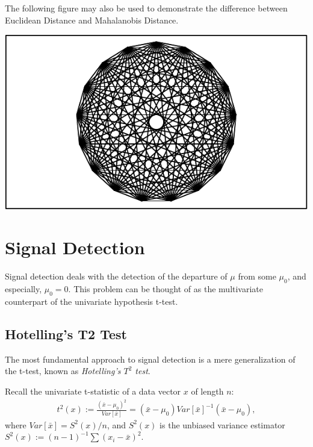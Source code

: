 \documentclass[]{book}
\theoremstyle{definition}
\theoremstyle{definition}
\theoremstyle{definition}
\theoremstyle{remark}
\let\BeginKnitrBlock\begin \let\EndKnitrBlock\end
\begin{document}
\BeginKnitrBlock{remark}
{}The following figure may also be used to demonstrate the difference between Euclidean Distance and Mahalanobis Distance.
\EndKnitrBlock{remark}

\includegraphics[width=0.5\linewidth]{Rcourse_files/figure-latex/unnamed-chunk-221-1}

\hypertarget{signal-detection}{%
\section{Signal Detection}\label{signal-detection}}

Signal detection deals with the detection of the departure of \(\mu\) from some \(\mu_0\), and especially, \(\mu_0=0\).
This problem can be thought of as the multivariate counterpart of the univariate hypothesis t-test.

\hypertarget{hotellings-t2-test}{%
\subsection{Hotelling's T2 Test}\label{hotellings-t2-test}}

The most fundamental approach to signal detection is a mere generalization of the t-test, known as \emph{Hotelling's \(T^2\) test}.

Recall the univariate t-statistic of a data vector \(x\) of length \(n\):
\begin{align}
  t^2(x):= \frac{(\bar{x}-\mu_0)^2}{Var[\bar{x}]}= (\bar{x}-\mu_0)Var[\bar{x}]^{-1}(\bar{x}-\mu_0),
  \label{eq:t-test}
\end{align}
where \(Var[\bar{x}]=S^2(x)/n\), and \(S^2(x)\) is the unbiased variance estimator \(S^2(x):=(n-1)^{-1}\sum (x_i-\bar x)^2\).
\end{document}
